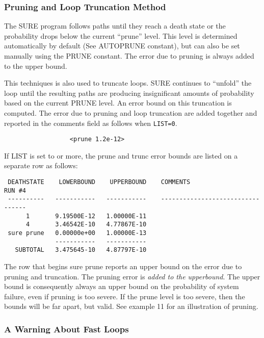\subsubsection{Pruning and Loop Truncation Method}
 
The SURE program follows paths until they reach a death state or the
probability drops below the current ``prune'' level.  This level is
determined automatically by default (See {\isf AUTOPRUNE} constant), but
can also be set manually using the {\isf PRUNE} constant.  The error
due to pruning is always added to the upper bound.

This techniques is also used to truncate loops. SURE continues to ``unfold''
the loop until the resulting paths are producing insignificant amounts of
probability based on the current {\isf PRUNE} level.  An error bound on this
truncation is computed.  The error due to pruning and loop truncation are
added together and reported in the comments field as follows when
\verb|LIST=0|.
\begin{verbatim}  
                  <prune 1.2e-12>
\end{verbatim}  
If {\isf LIST} is set to {} or more, the prune and trunc error bounds
are listed on a separate row as follows:
 
\begin{verbatim}  
 DEATHSTATE    LOWERBOUND    UPPERBOUND    COMMENTS                 RUN #4
 ----------   -----------   -----------    ---------------------------------
      1       9.19500E-12   1.00000E-11
      4       3.46542E-10   4.77867E-10
 sure prune   0.00000e+00   1.00000E-13
              -----------   -----------
   SUBTOTAL   3.475645-10   4.87797E-10
\end{verbatim}  
The row that begins {\isf sure prune} reports an upper bound on the error
due to pruning and truncation.  The pruning error is 
{\em added to the upperbound}.  The upper bound
is consequently always an upper bound on the probability of system
failure, even if pruning is too severe.  If the prune level is too
severe, then the bounds will be far apart, but valid.   See example 11
for an illustration of pruning.

\subsubsection{A Warning About Fast Loops}

